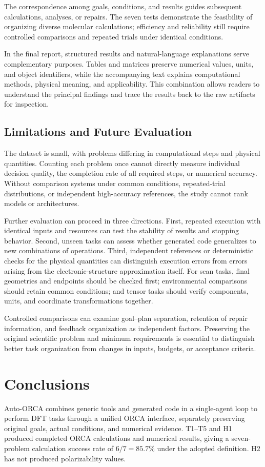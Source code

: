 The correspondence among goals, conditions, and results guides subsequent calculations, analyses, or repairs.
The seven tests demonstrate the feasibility of organizing diverse molecular calculations;
efficiency and reliability still require controlled comparisons and repeated trials under identical conditions.

In the final report, structured results and natural-language explanations serve complementary purposes.
Tables and matrices preserve numerical values, units, and object identifiers,
while the accompanying text explains computational methods, physical meaning, and applicability.
This combination allows readers to understand the principal findings and trace the results back to the raw artifacts for inspection.

\subsection{Limitations and Future Evaluation}
The dataset is small, with problems differing in computational steps and physical quantities.
Counting each problem once cannot directly measure individual decision quality, the completion rate of all required steps, or numerical accuracy.
Without comparison systems under common conditions, repeated-trial distributions, or independent high-accuracy references,
the study cannot rank models or architectures.

Further evaluation can proceed in three directions.
First, repeated execution with identical inputs and resources can test the stability of results and stopping behavior.
Second, unseen tasks can assess whether generated code generalizes to new combinations of operations.
Third, independent references or deterministic checks for the physical quantities can distinguish execution errors
from errors arising from the electronic-structure approximation itself.
For scan tasks, final geometries and endpoints should be checked first;
environmental comparisons should retain common conditions;
and tensor tasks should verify components, units, and coordinate transformations together.

Controlled comparisons can examine goal--plan separation, retention of repair information, and feedback organization as independent factors.
Preserving the original scientific problem and minimum requirements is essential
to distinguish better task organization from changes in inputs, budgets, or acceptance criteria.

\section{Conclusions}
Auto-ORCA combines generic tools and generated code in a single-agent loop
to perform DFT tasks through a unified ORCA interface, separately preserving original goals, actual conditions, and numerical evidence.
T1--T5 and H1 produced completed ORCA calculations and numerical results,
giving a seven-problem calculation success rate of $6/7=85.7\%$ under the adopted definition.
H2 has not produced polarizability values.

